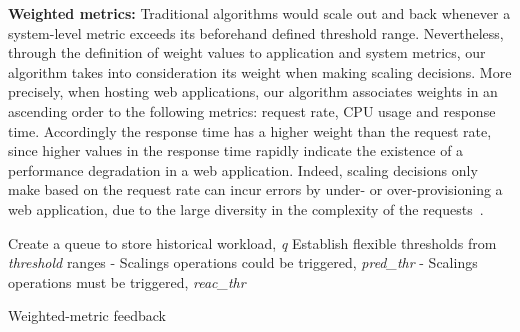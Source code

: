 \textbf{Weighted metrics:} Traditional algorithms would scale out and back whenever a system-level metric exceeds its beforehand defined threshold range. Nevertheless,  through the definition of weight values to application and system metrics, our algorithm takes into consideration its weight when making scaling decisions. More precisely, when hosting web applications, our algorithm associates weights in an ascending order to the following metrics: request rate, CPU usage and response time. Accordingly the response time has a higher weight than the request rate, since higher values in the response time rapidly indicate the existence of a performance degradation in a web application. Indeed, scaling decisions only make based on the request rate can incur errors by under- or over-provisioning  a web application, due to the large diversity in the complexity of the requests~\cite{singh_autonomic_2010}.



\begin{algorithm}
{\scriptsize
\SetAlgoLined
\SetInd{0mm}{2mm}
\BlankLine
Create a queue to store historical workload, \emph{q}\;
Establish flexible thresholds from \emph{threshold} ranges\;
\hspace{3mm}	- Scalings operations could be triggered, \emph{pred\_thr}\;
\hspace{3mm}	- Scalings operations must be triggered, \emph{reac\_thr}\; 
\BlankLine
{}
}
\caption{Weighted-metric feedback}
\label{history_prov}
\end{algorithm}


